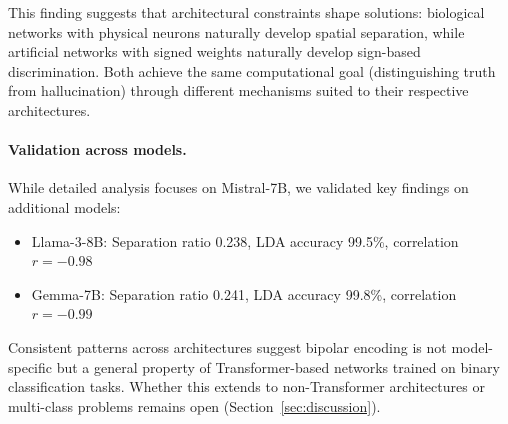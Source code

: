 \documentclass[11pt]{article}
\begin{document}
This finding suggests that architectural constraints shape solutions: biological networks with physical neurons naturally develop spatial separation, while artificial networks with signed weights naturally develop sign-based discrimination. Both achieve the same computational goal (distinguishing truth from hallucination) through different mechanisms suited to their respective architectures.

\paragraph{Validation across models.}
While detailed analysis focuses on Mistral-7B, we validated key findings on additional models:
\begin{itemize}
\item Llama-3-8B: Separation ratio 0.238, LDA accuracy 99.5\%, correlation $r = -0.98$
\item Gemma-7B: Separation ratio 0.241, LDA accuracy 99.8\%, correlation $r = -0.99$
\end{itemize}

Consistent patterns across architectures suggest bipolar encoding is not model-specific but a general property of Transformer-based networks trained on binary classification tasks. Whether this extends to non-Transformer architectures or multi-class problems remains open (Section~\ref{sec:discussion}).
\end{document}
